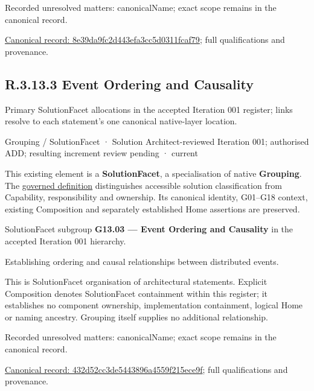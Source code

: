 {\small Recorded unresolved matters: canonicalName; exact scope remains in the canonical record.}\par
{\footnotesize \href{../../../../../../../continuum/grouping/8e39da9fc2d443efa3cc5d0311fcaf79.md}{Canonical record: 8e39da9fc2d443efa3cc5d0311fcaf79}; full qualifications and provenance.}\par
\subsection*{R.3.13.3 Event Ordering and Causality}
\label{navigation:R.3.13.3}

Primary SolutionFacet allocations in the accepted Iteration 001 register; links resolve to each statement’s one canonical native-layer location.\par
\label{element:432d52cc3de5443896a4559f215ece9f}
{\small Grouping / SolutionFacet · Solution Architect-reviewed Iteration 001; authorised ADD; resulting increment review pending · current}\par

This existing element is a \textbf{SolutionFacet}, a specialisation of native
\textbf{Grouping}. The \href{\detokenize{../../../../../../../governance/continuum-representation.md#solutionfacet-classification--1119-candidate}}{governed definition}
distinguishes accessible solution classification from Capability, responsibility
and ownership. Its canonical identity, G01–G18 context, existing Composition
and separately established Home assertions are preserved.



SolutionFacet subgroup \textbf{G13.03 — Event Ordering and Causality} in the accepted Iteration 001 hierarchy.



Establishing ordering and causal relationships between distributed events.



This is SolutionFacet organisation of architectural statements. Explicit Composition denotes SolutionFacet containment within this register; it establishes no component ownership, implementation containment, logical Home or naming ancestry. Grouping itself supplies no additional relationship.


{\small Recorded unresolved matters: canonicalName; exact scope remains in the canonical record.}\par
{\footnotesize \href{../../../../../../../continuum/grouping/432d52cc3de5443896a4559f215ece9f.md}{Canonical record: 432d52cc3de5443896a4559f215ece9f}; full qualifications and provenance.}\par
